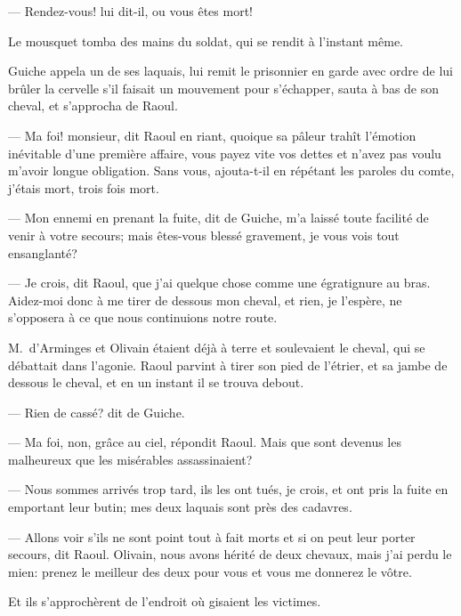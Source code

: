 — Rendez-vous! lui dit-il, ou vous êtes mort!

Le mousquet tomba des mains du soldat, qui se rendit à l'instant même.

Guiche appela un de ses laquais, lui remit le prisonnier en garde avec ordre de lui brûler la cervelle s'il faisait un mouvement pour s'échapper, sauta à bas de son cheval, et s'approcha de Raoul.

— Ma foi! monsieur, dit Raoul en riant, quoique sa pâleur trahît l'émotion inévitable d'une première affaire, vous payez vite vos dettes et n'avez pas voulu m'avoir longue obligation. Sans vous, ajouta-t-il en répétant les paroles du comte, j'étais mort, trois fois mort.

— Mon ennemi en prenant la fuite, dit de Guiche, m'a laissé toute facilité de venir à votre secours; mais êtes-vous blessé gravement, je vous vois tout ensanglanté?

— Je crois, dit Raoul, que j'ai quelque chose comme une égratignure au bras. Aidez-moi donc à me tirer de dessous mon cheval, et rien, je l'espère, ne s'opposera à ce que nous continuions notre route.

M.~d'Arminges et Olivain étaient déjà à terre et soulevaient le cheval, qui se débattait dans l'agonie. Raoul parvint à tirer son pied de l'étrier, et sa jambe de dessous le cheval, et en un instant il se trouva debout.

— Rien de cassé? dit de Guiche.

— Ma foi, non, grâce au ciel, répondit Raoul. Mais que sont devenus les malheureux que les misérables assassinaient?

— Nous sommes arrivés trop tard, ils les ont tués, je crois, et ont pris la fuite en emportant leur butin; mes deux laquais sont près des cadavres.

— Allons voir s'ils ne sont point tout à fait morts et si on peut leur porter secours, dit Raoul. Olivain, nous avons hérité de deux chevaux, mais j'ai perdu le mien: prenez le meilleur des deux pour vous et vous me donnerez le vôtre.

Et ils s'approchèrent de l'endroit où gisaient les victimes.